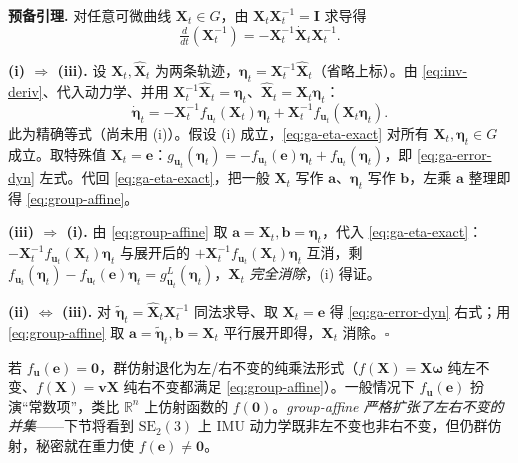 \begin{derivation}
\label{deriv:ga-equiv}
\textbf{预备引理.}\; 对任意可微曲线 $\mathbf{X}_t\in G$，由 $\mathbf{X}_t\mathbf{X}_t^{-1}=\mathbf{I}$ 求导得
\begin{equation}
  \tfrac{d}{dt}(\mathbf{X}_t^{-1})=-\mathbf{X}_t^{-1}\dot{\mathbf{X}}_t\mathbf{X}_t^{-1}.
  \label{eq:inv-deriv}
\end{equation}

\textbf{(i) $\Rightarrow$ (iii).}\; 设 $\mathbf{X}_t,\hat{\mathbf{X}}_t$ 为两条轨迹，$\boldsymbol{\eta}_t=\mathbf{X}_t^{-1}\hat{\mathbf{X}}_t$（省略上标）。由 \cref{eq:inv-deriv}、代入动力学、并用 $\mathbf{X}_t^{-1}\hat{\mathbf{X}}_t=\boldsymbol{\eta}_t$、$\hat{\mathbf{X}}_t=\mathbf{X}_t\boldsymbol{\eta}_t$：
\begin{equation}
  \dot{\boldsymbol{\eta}}_t=-\mathbf{X}_t^{-1}f_{\mathbf{u}_t}(\mathbf{X}_t)\boldsymbol{\eta}_t+\mathbf{X}_t^{-1}f_{\mathbf{u}_t}(\mathbf{X}_t\boldsymbol{\eta}_t).
  \label{eq:ga-eta-exact}
\end{equation}
此为精确等式（尚未用 (i)）。假设 (i) 成立，\cref{eq:ga-eta-exact} 对所有 $\mathbf{X}_t,\boldsymbol{\eta}_t\in G$ 成立。取特殊值 $\mathbf{X}_t=\mathbf{e}$：$g_{\mathbf{u}_t}(\boldsymbol{\eta}_t)=-f_{\mathbf{u}_t}(\mathbf{e})\boldsymbol{\eta}_t+f_{\mathbf{u}_t}(\boldsymbol{\eta}_t)$，即 \cref{eq:ga-error-dyn} 左式。代回 \cref{eq:ga-eta-exact}，把一般 $\mathbf{X}_t$ 写作 $\mathbf{a}$、$\boldsymbol{\eta}_t$ 写作 $\mathbf{b}$，左乘 $\mathbf{a}$ 整理即得 \cref{eq:group-affine}。

\textbf{(iii) $\Rightarrow$ (i).}\; 由 \cref{eq:group-affine} 取 $\mathbf{a}=\mathbf{X}_t,\mathbf{b}=\boldsymbol{\eta}_t$，代入 \cref{eq:ga-eta-exact}：$-\mathbf{X}_t^{-1}f_{\mathbf{u}_t}(\mathbf{X}_t)\boldsymbol{\eta}_t$ 与展开后的 $+\mathbf{X}_t^{-1}f_{\mathbf{u}_t}(\mathbf{X}_t)\boldsymbol{\eta}_t$ 互消，剩 $f_{\mathbf{u}_t}(\boldsymbol{\eta}_t)-f_{\mathbf{u}_t}(\mathbf{e})\boldsymbol{\eta}_t=g^L_{\mathbf{u}_t}(\boldsymbol{\eta}_t)$，$\mathbf{X}_t$ \emph{完全消除}，(i) 得证。

\textbf{(ii) $\Leftrightarrow$ (iii).}\; 对 $\tilde{\boldsymbol{\eta}}_t=\hat{\mathbf{X}}_t\mathbf{X}_t^{-1}$ 同法求导、取 $\mathbf{X}_t=\mathbf{e}$ 得 \cref{eq:ga-error-dyn} 右式；用 \cref{eq:group-affine} 取 $\mathbf{a}=\tilde{\boldsymbol{\eta}}_t,\mathbf{b}=\mathbf{X}_t$ 平行展开即得，$\mathbf{X}_t$ 消除。$\square$
\end{derivation}

\begin{insight}
若 $f_{\mathbf{u}}(\mathbf{e})=\mathbf{0}$，群仿射退化为左/右不变的纯乘法形式（$f(\mathbf{X})=\mathbf{X}\boldsymbol{\omega}$ 纯左不变、$f(\mathbf{X})=\mathbf{v}\mathbf{X}$ 纯右不变都满足 \cref{eq:group-affine}）。一般情况下 $f_{\mathbf{u}}(\mathbf{e})$ 扮演“常数项”，类比 $\mathbb{R}^n$ 上仿射函数的 $f(\mathbf{0})$。\emph{group-affine 严格扩张了左右不变的并集}——下节将看到 $\mathrm{SE}_2(3)$ 上 IMU 动力学既非左不变也非右不变，但仍群仿射，秘密就在重力使 $f(\mathbf{e})\neq\mathbf{0}$。
\end{insight}

